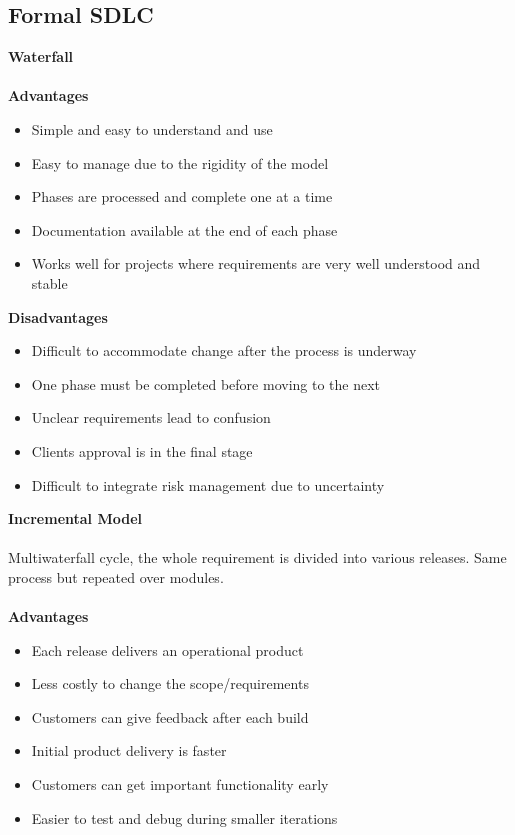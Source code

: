 \documentclass[a4paper,10pt]{article}
\begin{document}
\subsection*{Formal SDLC}
\textcolor{BlueGreen}{\textbf{Waterfall}} \\\\
\textbf{Advantages}
\begin{itemize}
	\item Simple and easy to understand and use 
	\item Easy to manage due to the rigidity of the model 
	\item Phases are processed and complete one at a time
	\item Documentation available at the end of each phase 
	\item Works well for projects where requirements are very well understood and stable
\end{itemize}
\textbf{Disadvantages}
\begin{itemize}
	\item Difficult to accommodate change after the process is underway
	\item One phase must be completed before moving to the next 
	\item Unclear requirements lead to confusion 
	\item Clients approval is in the final stage 
	\item Difficult to integrate risk management due to uncertainty\\
\end{itemize}
\textcolor{BlueGreen}{\textbf{Incremental Model}}\\\\
Multiwaterfall cycle, the whole requirement is divided into various releases. Same process but repeated over modules.\\\\
\textbf{Advantages}
\begin{itemize}
	\item Each release delivers an operational product 
	\item Less costly to change the scope/requirements 
	\item Customers can give feedback after each build 
	\item Initial product delivery is faster 
	\item Customers can get important functionality early
	\item Easier to test and debug during smaller iterations 
\end{itemize}
\end{document}
